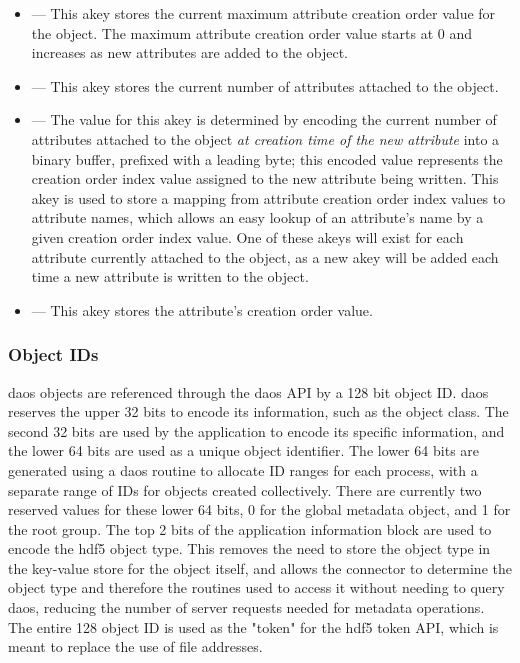 \documentclass[../design_doc.tex]{subfiles}
\begin{document}
\begin{itemize}
 \item {} --- This \gls{akey} stores the current maximum attribute creation order value for the object. The maximum attribute creation order value starts at 0 and increases as new attributes are added to the object.
 \item {} --- This \gls{akey} stores the current number of attributes attached to the object.
 \item {} --- The value for this \gls{akey} is determined by encoding the current number of attributes attached to the object \textit{at creation time of the new attribute} into a binary buffer, prefixed with a leading  byte; this encoded value represents the creation order index value assigned to the new attribute being written. This \gls{akey} is used to store a mapping from attribute creation order index values to attribute names, which allows an easy lookup of an attribute's name by a given creation order index value. One of these \glspl{akey} will exist for each attribute currently attached to the object, as a new \gls{akey} will be added each time a new attribute is written to the object.
 \item {} --- This \gls{akey} stores the attribute's creation order value.
\end{itemize}


\newpage

\subsubsection{Object IDs}


\acrshort{daos} objects are referenced through the \acrshort{daos} API by a 128 bit object ID. \acrshort{daos} reserves the upper 32 bits to encode its information, such as the object class. The second 32 bits are used by the application to encode its specific information, and the lower 64 bits are used as a unique object identifier. The lower 64 bits are generated using a \acrshort{daos} routine to allocate ID ranges for each process, with a separate range of IDs for objects created collectively. There are currently two reserved values for these lower 64 bits, 0 for the global metadata object, and 1 for the root group. The top 2 bits of the application information block are used to encode the \acrshort{hdf5} object type. This removes the need to store the object type in the key-value store for the object itself, and allows the \gls{connector} to determine the object type and therefore the routines used to access it without needing to query \acrshort{daos}, reducing the number of server requests needed for metadata operations. The entire 128 object ID is used as the "token" for the \acrshort{hdf5} token API, which is meant to replace the use of file addresses.
\end{document}
